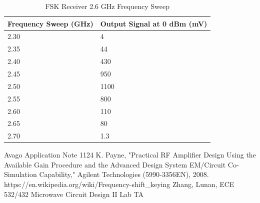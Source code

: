 \documentclass[conference]{IEEEtran}
\begin{document}
\begin{table}
\caption{FSK Receiver 2.6 GHz Frequency Sweep}
\begin{tabular}{|l|l|}
\hline
Frequency Sweep (GHz) & Output Signal at 0 dBm (mV) \\ \hline
2.30 & 4 \\ \hline
2.35 & 44 \\ \hline
2.40 & 430 \\ \hline
2.45 & 950 \\ \hline
2.50 & 1100 \\ \hline
2.55 & 800 \\\hline
2.60 & 110 \\ \hline
2.65 & 80 \\\hline
2.70 & 1.3 \\\hline
\end{tabular}
\label{tab:fsk26}
\end{table}

\begin{thebibliography}{1}
Avago Application Note 1124
K. Payne, "Practical RF Amplifier Design Using the Available Gain Procedure and the Advanced Design System EM/Circuit Co-Simulation Capability," Agilent Technologies (5990-3356EN), 2008.
https://en.wikipedia.org/wiki/Frequency-shift\_keying
Zhang, Lunan, ECE 532/432 Microwave Circuit Design II Lab TA
\end{thebibliography}
\end{document}
